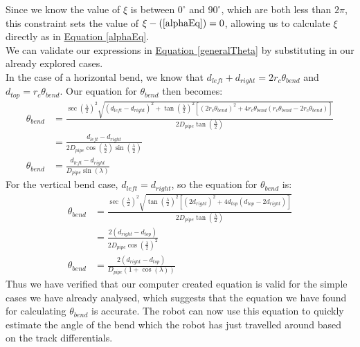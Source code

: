 \documentclass[11pt]{article}		%
\begin{document}
		Since we know the value of $\xi$ is between $0^\circ$ and $90^\circ$, which are both less than $2 \pi$, this constraint sets the value of $\xi - (\ref*{alphaEq}) = 0$, allowing us to calculate $\xi$ directly as in \hyperref[alphaEq]{Equation \ref*{alphaEq}}.
		\\
		We can validate our expressions in \hyperref[generalTheta]{Equation \ref*{generalTheta}} by substituting in our already explored cases.
		\\
		In the case of a horizontal bend, we know that $d_{left} + d_{right} = 2 r_c \theta_{bend} $ and $d_{top} = r_c \theta_{bend}$.
		Our equation for $\theta_{bend}$ then becomes:
		\begin{align*}
			\theta_{bend} &= \frac{ \sec \left( \frac{\lambda}{2} \right)^2 \sqrt{ \left( d_{left} - d_{right} \right)^2 +  \tan \left( \frac{\lambda}{2} \right)^2 \left[ \left( 2 r_c \theta_{bend} \right)^2 + 4 r_c \theta_{bend} \left( r_c \theta_{bend}  - 2 r_c \theta_{bend} \right) \right] } }{2 D_{pipe} \tan \left( \frac{\lambda}{2} \right)}
			\\
			&= \frac{d_{left} - d_{right}}{2 D_{pipe} \cos \left( \frac{\lambda}{2} \right) \sin \left( \frac{\lambda}{2} \right)}
			\\
			\theta_{bend} &= \frac{d_{left} - d_{right}}{D_{pipe} \sin \left( \lambda \right)}
		\end{align*}
		For the vertical bend case, $d_{left} = d_{right}$, so the equation for $\theta_{bend}$ is:
		\begin{align*}
			\theta_{bend} &= \frac{ \sec \left( \frac{\lambda}{2} \right)^2 \sqrt{ \tan \left( \frac{\lambda}{2} \right)^2 \left[ \left( 2 d_{right} \right)^2 + 4 d_{top} \left( d_{top} - 2 d_{right} \right) \right] } }{2 D_{pipe} \tan \left( \frac{\lambda}{2} \right)}
			\\
			&= \frac{2 \left( d_{right} - d_{top} \right)}{2 D_{pipe} \cos \left( \frac{\lambda}{2} \right)^2}
			\\
			\theta_{bend} &= \frac{2 \left( d_{right} - d_{top} \right)}{D_{pipe} \left( 1 + \cos \left( \lambda \right) \right)}
		\end{align*}
		Thus we have verified that our computer created equation is valid for the simple cases we have already analysed, which suggests that the equation we have found for calculating $\theta_{bend}$ is accurate.
		The robot can now use this equation to quickly estimate the angle of the bend which the robot has just travelled around based on the track differentials.
		 		
\end{document}

